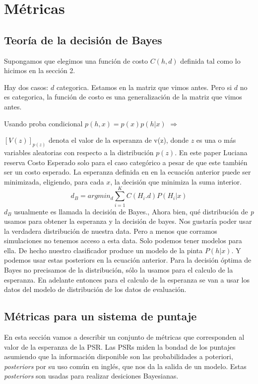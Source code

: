 \documentclass[11pt,a4paper,twoside]{tesis}
\begin{document}
\section{Métricas}

\subsection{Teoría de la decisión de Bayes}
Supongamos que elegimos una función de costo $C(h,d)$ definida tal como lo hicimos en la sección 2.

Hay dos casos:
$d$ categorica. Estamos en la matriz que vimos antes. Pero si $d$ no es categorica, la función de costo es una generalización de la matriz que vimos antes.

Usando proba condicional
$p(h,x) = p(x) p(h|x)$ 
$\Longrightarrow$

$[V(z)]_{p(z)}$ denota el valor de la esperanza de v(z), donde $z$ es una o más variables aleatorias con respecto a la distribución $p(z)$. En este paper Luciana reserva Costo Esperado solo para el caso categórico a pesar de que este también ser un costo esperado.
La esperanza definida en en la ecuación anterior puede ser minimizada, eligiendo, para cada $x$, la decisión que minimiza la suma interior.
\begin{equation}
    d_B = argmin _{d} \sum^K_{i=1} C(H_i. d) P(H_i|x) 
\end{equation}
$d_B$ usualmente es llamada la decisión de Bayes., 
Ahora bien, qué distribución de \textit{p} usamos para obtener la esperanza y la decisión de bayes.   Nos gustaría poder usar la verdadera distribución de nuestra data. Pero a menos que corramos simulaciones no tenemos acceso a esta data. Solo podemos tener modelos para ella. De hecho nuestro clasificador produce un modelo de la pinta $P(h|x)$. Y podemos usar estas posteriors en la ecuación anterior. Para la decisión óptima de Bayes no precisamos de la distribución, sólo la usamos para el calculo de la esperanza. En adelante entonces para el calculo de la esperanza se van a usar los datos del modelo de distribución de los datos de evaluación. 

\subsection{Métricas para un sistema de puntaje}

En esta sección vamos a describir un conjunto de métricas que corresponden al valor de la esperanza de la PSR. Las PSRs miden la bondad de los puntajes asumiendo que la información disponible son las probabilidades a poteriori, \textit{posteriors} por su uso común en inglés, que nos da la salida de un modelo. Estas \textit{posteriors} son usadas para realizar desiciones Bayesianas. 
\end{document}
